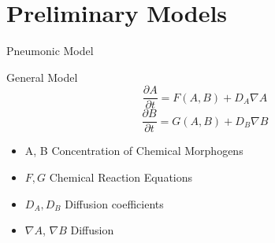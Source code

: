 \documentclass[t,10pt,fleqn]{beamer}
\begin{document}
\section{Preliminary Models}
\begin{frame}{Pneumonic Model}
  \vspace{-.3cm}
  \begin{block}{General Model}
      $$\frac{\partial A}{\partial t} = F(A,B) + D_{A} \nabla A$$
      $$\frac{\partial B}{\partial t} = G(A,B) + D_{B} \nabla B$$
      \pause
    \begin{itemize}
      \item A, B Concentration of Chemical Morphogens
      \pause
      \item $F, G$ Chemical Reaction Equations
      \pause
      \item $D_{A}, D_{B}$ Diffusion coefficients
      \pause
      \item $\nabla A$, $\nabla B$ Diffusion
      \pause
    \end{itemize}
  \end{block}
  \pause
\end{frame}
\end{document}
